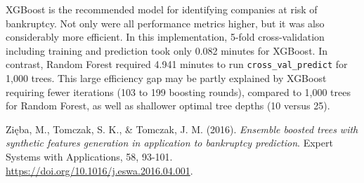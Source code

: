 \documentclass{article}      %
\begin{document}
XGBoost is the recommended model for identifying companies at risk of bankruptcy. Not only were all performance metrics higher, but it was also considerably more efficient. In this implementation, 5-fold cross-validation including training and prediction took only 0.082 minutes for XGBoost. In contrast, Random Forest required 4.941 minutes to run \texttt{cross\_val\_predict} for 1,000 trees. This large efficiency gap may be partly explained by XGBoost requiring fewer iterations (103 to 199 boosting rounds), compared to 1,000 trees for Random Forest, as well as shallower optimal tree depths (10 versus 25).

\FloatBarrier

\begin{thebibliography}{99}

Zi\k{e}ba, M., Tomczak, S. K., \& Tomczak, J. M. (2016).
\textit{Ensemble boosted trees with synthetic features generation in application to bankruptcy prediction}.
Expert Systems with Applications, 58, 93-101.
\url{https://doi.org/10.1016/j.eswa.2016.04.001}.

\end{thebibliography}
\end{document}
